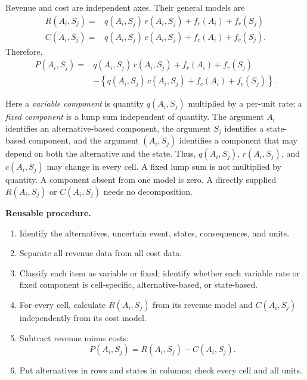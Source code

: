 Revenue and cost are independent axes. Their general models are
\[
\begin{aligned}
	R(A_i,S_j)
	={}&
	q(A_i,S_j)\,r(A_i,S_j)
	+
	f_r(A_i)
	+
	f_r(S_j)
	\\
	C(A_i,S_j)
	={}&
	q(A_i,S_j)\,c(A_i,S_j)
	+
	f_c(A_i)
	+
	f_c(S_j).
\end{aligned}
\]
Therefore,
\[
\begin{aligned}
	P(A_i,S_j)
	={}&
	q(A_i,S_j)\,r(A_i,S_j)
	+
	f_r(A_i)
	+
	f_r(S_j)
	\\
	&-
	\left\{
	q(A_i,S_j)\,c(A_i,S_j)
	+
	f_c(A_i)
	+
	f_c(S_j)
	\right\}.
\end{aligned}
\]

Here a \emph{variable component} is quantity \(q(A_i,S_j)\) multiplied by a
per-unit rate; a \emph{fixed component} is a lump sum independent of quantity.
The argument \(A_i\) identifies an alternative-based component, the argument
\(S_j\) identifies a state-based component, and the argument
\((A_i,S_j)\) identifies a component that may depend on both the alternative
and the state. Thus, \(q(A_i,S_j)\), \(r(A_i,S_j)\), and \(c(A_i,S_j)\) may
change in every cell. A fixed lump sum is not multiplied by quantity. A
component absent from one model is zero. A directly supplied
\(R(A_i,S_j)\) or \(C(A_i,S_j)\) needs no decomposition.

\textbf{Reusable procedure.}
\begin{enumerate}[label=\arabic*.]
	\item Identify the alternatives, uncertain event, states, consequences, and
	units.
	
	\item Separate all revenue data from all cost data.
	
	\item Classify each item as variable or fixed; identify whether each
	variable rate or fixed component is cell-specific, alternative-based, or
	state-based.
	
	\item For every cell, calculate \(R(A_i,S_j)\) from its revenue model and
	\(C(A_i,S_j)\) independently from its cost model.
	
	\item Subtract revenue minus costs:
	\[
	P(A_i,S_j)=R(A_i,S_j)-C(A_i,S_j).
	\]
	
	\item Put alternatives in rows and states in columns; check every cell and
	all units.
\end{enumerate}

